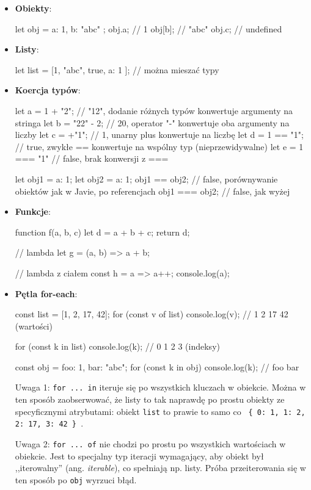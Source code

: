 \begin{itemize}
\item \textbf{Obiekty}:
    \begin{js}
        let obj = { a: 1, b: "abc" };
        obj.a; // 1
        obj[b]; // "abc"
        obj.c; // undefined
    \end{js}

\item \textbf{Listy}:
    \begin{js}
        let list = [1, "abc", true, { a: 1 }]; // można mieszać typy
    \end{js}

\item \textbf{Koercja typów}:
    \begin{js}
        let a = 1 + "2"; // "12", dodanie różnych typów konwertuje argumenty na stringa
        let b = "22" - 2; // 20, operator "-" konwertuje oba argumenty na liczby
        let c = +"1"; // 1, unarny plus konwertuje na liczbę
        let d = 1 == "1"; // true, zwykłe == konwertuje na wspólny typ (nieprzewidywalne)
        let e = 1 === "1" // false, brak konwersji z ===

        let obj1 = {a: 1};
        let obj2 = {a: 1};
        obj1 == obj2; // false, porównywanie obiektów jak w Javie, po referencjach
        obj1 === obj2; // false, jak wyżej
    \end{js}

\item \textbf{Funkcje}:
    \begin{js}
        function f(a, b, c) {
            let d = a + b + c;
            return d;
        }

        // lambda
        let g = (a, b) => a + b;

        // lambda z ciałem
        const h = a => {
            a++;
            console.log(a);
        }
    \end{js}

\item \textbf{Pętla for-each}:
    \begin{js}
        const list = [1, 2, 17, 42];
        for (const v of list) {
            console.log(v); // 1 2 17 42 (wartości)
        }

        for (const k in list) {
            console.log(k); // 0 1 2 3 (indeksy)
        }

        const obj = {foo: 1, bar: "abc"};
        for (const k in obj) {
            console.log(k); // foo bar
        }
    \end{js}

    Uwaga 1: \texttt{for ... in} iteruje się po wszystkich kluczach w obiekcie. Można w ten sposób zaobserwować, że listy to tak naprawdę po prostu obiekty ze specyficznymi atrybutami: obiekt \texttt{list} to prawie to samo co \texttt{ \{ 0: 1, 1: 2, 2: 17, 3: 42 \} }.

    Uwaga 2: \texttt{for ... of} nie chodzi po prostu po wszystkich wartościach w obiekcie. Jest to specjalny typ iteracji wymagający, aby obiekt był ,,iterowalny'' (ang. \textit{iterable}), co spełniają np. listy. Próba przeiterowania się w ten sposób po \texttt{obj} wyrzuci błąd.
\end{itemize}

